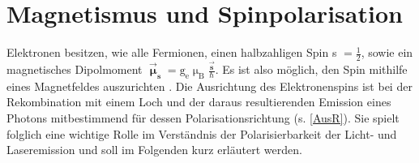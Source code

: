 \section{Magnetismus und Spinpolarisation}
Elektronen besitzen, wie alle Fermionen, einen halbzahligen Spin  s $= \frac{1}{2}$, sowie ein magnetisches Dipolmoment $\vec{\boldsymbol{\upmu}}_{\textbf{s}}=\text{g}_\text{e}\upmu_\text{B}\frac{\vec{\textbf{s}}}{\hbar}$. Es ist also möglich, den Spin mithilfe eines Magnetfeldes auszurichten \cite{Gross.2014}. Die Ausrichtung des Elektronenspins ist bei der Rekombination mit einem Loch und der daraus resultierenden Emission eines Photons mitbestimmend für dessen Polarisationsrichtung (s. \autoref{AusR}). Sie spielt folglich eine wichtige Rolle im Verständnis der Polarisierbarkeit der Licht- und Laseremission und soll im Folgenden kurz erläutert werden.
